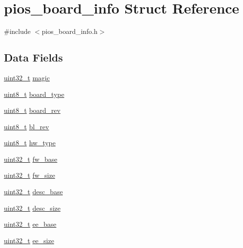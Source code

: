 \hypertarget{structpios__board__info}{\section{pios\-\_\-board\-\_\-info Struct Reference}
\label{structpios__board__info}
}


{\ttfamily \#include $<$pios\-\_\-board\-\_\-info.\-h$>$}

\subsection*{Data Fields}
\begin{DoxyCompactItemize}
\item 
\hyperlink{stdint_8h_a435d1572bf3f880d55459d9805097f62}{uint32\-\_\-t} \hyperlink{structpios__board__info_aab5bc5b7905e46df6cc7fd90fdb318d4}{magic}
\item 
\hyperlink{stdint_8h_aba7bc1797add20fe3efdf37ced1182c5}{uint8\-\_\-t} \hyperlink{structpios__board__info_a5aff4607db694a6885c0ce5361afa9bb}{board\-\_\-type}
\item 
\hyperlink{stdint_8h_aba7bc1797add20fe3efdf37ced1182c5}{uint8\-\_\-t} \hyperlink{structpios__board__info_a7c5ba691095b534927e3f0b6cc7202d6}{board\-\_\-rev}
\item 
\hyperlink{stdint_8h_aba7bc1797add20fe3efdf37ced1182c5}{uint8\-\_\-t} \hyperlink{structpios__board__info_ab862f6bf9209684556e24b7e7cd014f7}{bl\-\_\-rev}
\item 
\hyperlink{stdint_8h_aba7bc1797add20fe3efdf37ced1182c5}{uint8\-\_\-t} \hyperlink{structpios__board__info_a3a94af2d49603c2cbef32e8b56e5c057}{hw\-\_\-type}
\item 
\hyperlink{stdint_8h_a435d1572bf3f880d55459d9805097f62}{uint32\-\_\-t} \hyperlink{structpios__board__info_ab478e3140ec858f6347f061cf10d8cf5}{fw\-\_\-base}
\item 
\hyperlink{stdint_8h_a435d1572bf3f880d55459d9805097f62}{uint32\-\_\-t} \hyperlink{structpios__board__info_a0b8e1fae0f06a06384829d6f2dfe5f20}{fw\-\_\-size}
\item 
\hyperlink{stdint_8h_a435d1572bf3f880d55459d9805097f62}{uint32\-\_\-t} \hyperlink{structpios__board__info_abf65ae5cf522219445a2fc436a771365}{desc\-\_\-base}
\item 
\hyperlink{stdint_8h_a435d1572bf3f880d55459d9805097f62}{uint32\-\_\-t} \hyperlink{structpios__board__info_aab7aa8138d0df454158a720741756931}{desc\-\_\-size}
\item 
\hyperlink{stdint_8h_a435d1572bf3f880d55459d9805097f62}{uint32\-\_\-t} \hyperlink{structpios__board__info_a67ef167840d1d40c2ea296544f664c22}{ee\-\_\-base}
\item 
\hyperlink{stdint_8h_a435d1572bf3f880d55459d9805097f62}{uint32\-\_\-t} \hyperlink{structpios__board__info_a3ffc56de2b782e6e19c33e68ffd9716d}{ee\-\_\-size}
\end{DoxyCompactItemize}



